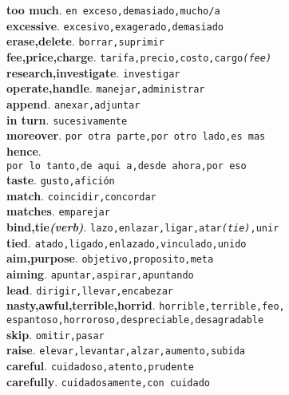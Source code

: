\documentclass[twocolumn]{article}
\begin{document}
	\textsf{\textbf{too much}}. \texttt{en exceso,demasiado,mucho/a}\\
	\textsf{\textbf{excessive}}. \texttt{excesivo,exagerado,demasiado}\\
	\textsf{\textbf{erase,delete}}. \texttt{borrar,suprimir}\\
	\textsf{\textbf{fee,price,charge}}. \texttt{tarifa,precio,costo,cargo{\scriptsize \textsl{(fee)}}}\\
	\textsf{\textbf{research,investigate}}. \texttt{investigar}\\
	\textsf{\textbf{operate,handle}}. \texttt{manejar,administrar}\\
	\textsf{\textbf{append}}. \texttt{anexar,adjuntar}\\
	\textsf{\textbf{in turn}}. \texttt{sucesivamente}\\
	\textsf{\textbf{moreover}}. \texttt{por otra parte,por otro lado,es mas}\\
	\textsf{\textbf{hence}}.\\\texttt{por lo tanto,de aqui a,desde ahora,por eso}\\
	\textsf{\textbf{taste}}. \texttt{gusto,afici\'on}\\
	\textsf{\textbf{match}}. \texttt{coincidir,concordar}\\
	\textsf{\textbf{matches}}. \texttt{emparejar}\\
	\textsf{\textbf{bind,tie{\scriptsize \textsl{(verb)}}}}. \texttt{lazo,enlazar,ligar,atar{\scriptsize \textsl{(tie)}},unir}\\
	\textsf{\textbf{tied}}. \texttt{atado,ligado,enlazado,vinculado,unido}\\
	\textsf{\textbf{aim,purpose}}. \texttt{objetivo,proposito,meta}\\
	\textsf{\textbf{aiming}}. \texttt{apuntar,aspirar,apuntando}\\
	\textsf{\textbf{lead}}. \texttt{dirigir,llevar,encabezar}\\
	\textsf{\textbf{nasty,awful,terrible,horrid}}. \texttt{horrible,terrible,feo,\\espantoso,horroroso,despreciable,desagradable}\\
	\textsf{\textbf{skip}}. \texttt{omitir,pasar}\\
	\textsf{\textbf{raise}}. \texttt{elevar,levantar,alzar,aumento,subida}\\
	\textsf{\textbf{careful}}. \texttt{cuidadoso,atento,prudente}\\
	\textsf{\textbf{carefully}}. \texttt{cuidadosamente,con cuidado}\\
\end{document}
